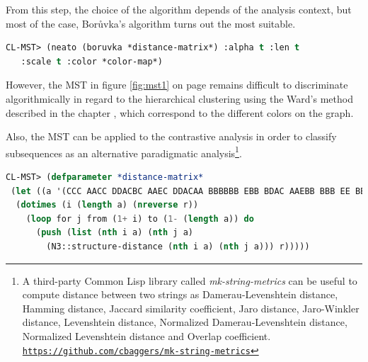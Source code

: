 \smallskip

From this step, the choice of the algorithm depends of the analysis context, but most of the case, Bor\r{u}vka's algorithm turns out the most suitable.

\smallskip

\begin{lstlisting}[language=Lisp]
CL-MST> (neato (boruvka *distance-matrix*) :alpha t :len t 
   :scale t :color *color-map*)
\end{lstlisting}

\smallskip

However, the MST in figure \ref{fig:mst1} on page \pageref{fig:mst1} remains difficult to discriminate algorithmically in regard to the hierarchical clustering using the Ward's method described in the chapter \textsl{}, which correspond to the different colors on the graph. 

\bigskip

Also, the MST can be applied to the contrastive analysis in order to classify subsequences as an alternative paradigmatic analysis\footnote{A third-party Common Lisp library called \textsl{mk-string-metrics} can be useful to compute distance between two strings as Damerau-Levenshtein distance, Hamming distance, Jaccard similarity coefficient, Jaro distance, Jaro-Winkler distance, Levenshtein distance, Normalized Damerau-Levenshtein distance, Normalized Levenshtein distance and Overlap coefficient.\\ \indent \href{https://github.com/cbaggers/mk-string-metrics}{\texttt{\scriptsize https://github.com/cbaggers/mk-string-metrics}}}.

\smallskip

\begin{lstlisting}[language=Lisp]
CL-MST> (defparameter *distance-matrix*
 (let ((a '(CCC AACC DDACBC AAEC DDACAA BBBBBB EBB BDAC AAEBB BBB EE BBBBACDEAAEAA CBB BBEAA AABBAD ABCC ACEC DDACDBAE CDAA ABBEAAEBAD AE DEAA EAD DC CBE ABBC EBD ABDAA EBAA ABBEAABC DBB)) r)
  (dotimes (i (length a) (nreverse r))
    (loop for j from (1+ i) to (1- (length a)) do
      (push (list (nth i a) (nth j a)
        (N3::structure-distance (nth i a) (nth j a))) r)))))
\end{lstlisting}

